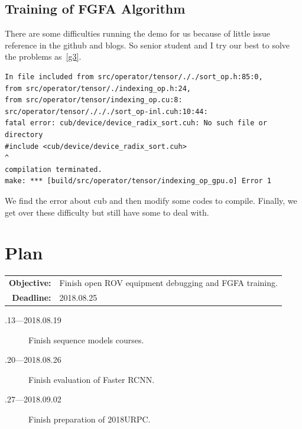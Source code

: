 \documentclass[a4paper]{article}
\begin{document}
\subsection{Training of FGFA Algorithm}

There are some difficulties running the demo for us because of little issue reference in the github and blogs. So senior student and I try our best to solve the problems as~\ref{g3}.

\lstset{language=python}
\begin{lstlisting}
In file included from src/operator/tensor/././sort_op.h:85:0,
from src/operator/tensor/./indexing_op.h:24,
from src/operator/tensor/indexing_op.cu:8:
src/operator/tensor/./././sort_op-inl.cuh:10:44: 
fatal error: cub/device/device_radix_sort.cuh: No such file or directory
#include <cub/device/device_radix_sort.cuh>
^
compilation terminated.
make: *** [build/src/operator/tensor/indexing_op_gpu.o] Error 1
\end{lstlisting}\label{g3}

We find the error about cub and then modify some codes to compile. Finally, we get over these difficulty but still have some to deal with. 


\section{Plan}

\begin{tabular}{rl}
	\textbf{Objective:} & Finish open ROV equipment debugging and FGFA training. \\
	\textbf{Deadline:} & 2018.08.25
\end{tabular}

\begin{description}
	\item[.13---2018.08.19] Finish sequence models courses.
	\item[.20---2018.08.26] Finish evaluation of Faster RCNN.
	\item[.27---2018.09.02] Finish preparation of 2018URPC.
\end{description}





\end{document}
